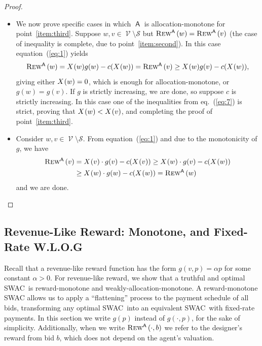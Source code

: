 \documentclass[11pt,letterpaper]{article}
\newcommand{\amono}{allocation-monotone\xspace}
\newcommand{\wamono}{weakly-allocation-monotone\xspace}
\newcommand{\rmono}{reward-monotone\xspace}
\newcommand{\fr}{fixed-rate\xspace}
\newcommand{\FR}{Fixed-Rate\xspace}
\newcommand{\swac}{SWAC\xspace}
\DeclareMathOperator{\A}{\auc{A}}
\renewcommand{\S}{\mathcal{S}}
\DeclareMathOperator{\V}{\mathcal{V}}
\newcommand{\g}{g}
\theoremstyle{plain}
\newcommand{\auc}[1]{\mathsf{#1}}
\begin{document}
\begin{proof}
\begin{itemize}
    Suppose $\x{w}>\x{v}$. In this case, as we proved above, $\g(w)=\g(v)$. Thus, since $\trew[\A]{w}\neq \trew[\A]{v}$, the inequality~(\ref{eq:2}) is strict, and subsequently one of the inequalities in eq.~(\ref{eq:7}) is also strict, which is a contradiction to $\g(w)=\g(v)$ and completes the proof of point~\ref{item:second}.
    \item 
    We now prove specific cases in which $\A$ is \amono for point~\ref{item:third}. Suppose $w,v\in\V\setminus\S$ but $\trew[\A]{w}=\trew[\A]{v}$ (the case of inequality is complete, due to point~\ref{item:second}). In this case equation~(\ref{eq:1}) yields
    \begin{align*}
        \trew[\A]{w}=\x{w}\g(w)-c(\x{w})=\trew[\A]{v}\geq\x{w}\g(v)-c(\x{w}),
    \end{align*}
    giving either $\x{w}=0$, which is enough for \amono, or $\g(w)=\g(v)$. If $\g$ is strictly increasing, we are done, so suppose $c$ is strictly increasing. In this case one of the inequalities from eq.~(\ref{eq:7}) is strict, proving that $\x{w}<\x{v}$, and completing the proof of point~\ref{item:third}.
    \item Consider $w,v\in\V\setminus\S$. From equation~(\ref{eq:1}) and due to the monotonicity of $\g$, we have 
    \begin{align*}
        \trew[\A]{v}&=\x{v}\cdot \g(v)-c(\x{v})
        \geq \x{w}\cdot\g(v)-c(\x{w})
        \\&\geq \x{w}\cdot\g(w)-c(\x{w})=\trew[\A]{w}
    \end{align*}
    and we are done.

    \end{itemize}

\end{proof}


\subsection{Revenue-Like Reward: Monotone, and \FR W.L.O.G}\label{sec:revenue-like-mono}

Recall that a revenue-like reward function
has the form $\g(v,p)=\alpha p$ for some constant $\alpha>0$.
For revenue-like reward, we show that a truthful and optimal \swac\ is \rmono and \wamono. 
A \rmono \swac
allows us to apply a ``flattening'' process to the payment schedule of all bids,
transforming any optimal \swac\ into an equivalent \swac\ with \fr payments.
In this section we write $\g(p)$ instead of $\g(\cdot,p)$, for the sake of simplicity. Additionally, when we write $\rew[\A]{\cdot}{b}$ we refer to the designer's reward from bid $b$, which does not depend on the agent's valuation.
\end{document}
